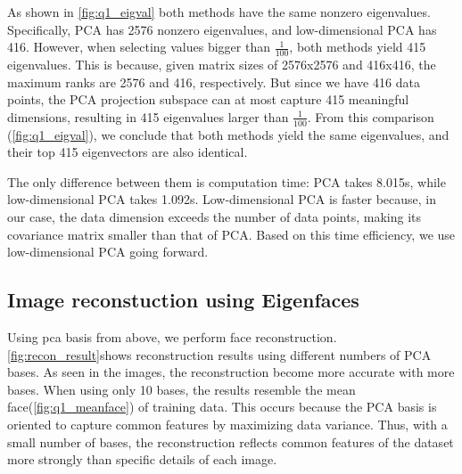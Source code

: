 As shown in \cref{fig:q1_eigval} both methods have the same nonzero eigenvalues. Specifically, PCA has 2576 nonzero eigenvalues, and low-dimensional PCA has 416. However, when selecting values bigger than $\frac{1}{100}$, both methods yield 415 eigenvalues. This is because, given matrix sizes of 2576x2576 and 416x416, the maximum ranks are 2576 and 416, respectively. But since we have 416 data points, the PCA projection subspace can at most capture 415 meaningful dimensions, resulting in 415 eigenvalues larger than $\frac{1}{100}$. From this comparison (\cref{fig:q1_eigval}), we conclude that both methods yield the same eigenvalues, and their top 415 eigenvectors are also identical.

The only difference between them is computation time: PCA takes 8.015s, while low-dimensional PCA takes 1.092s. Low-dimensional PCA is faster because, in our case, the data dimension exceeds the number of data points, making its covariance matrix smaller than that of PCA. Based on this time efficiency, we use low-dimensional PCA going forward. %


\subsection{Image reconstuction using Eigenfaces}
Using pca basis from above, we perform face reconstruction. \cref{fig:recon_result}shows reconstruction results using different numbers of PCA bases. As seen in the images, the reconstruction become more accurate with more bases. When using only 10 bases, the results resemble the mean face(\cref{fig:q1_meanface}) of training data. This occurs because the PCA basis is oriented to capture common features by maximizing data variance. Thus, with a small number of bases, the reconstruction reflects common features of the dataset more strongly than specific details of each image.
\vspace{-0.2cm}

